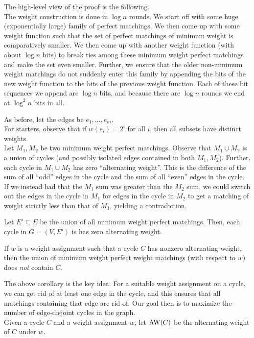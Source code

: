 		The high-level view of the proof is the following.\\
		The weight construction is done in $\log n$ rounds. We start off with some huge (exponentially large) family of perfect matchings. We then come up with some weight function such that the set of perfect matchings of minimum weight is comparatively smaller. We then come up with another weight function (with about $\log n$ bits) to break ties among these minimum weight perfect matchings and make the set even smaller. Further, we ensure that the older non-minimum weight matchings do not suddenly enter this family by appending the bits of the new weight function to the bits of the previous weight function. Each of these bit sequences we append are $\log n$ bits, and because there are $\log n$ rounds we end at $\log^2 n$ bits in all.

		As before, let the edges be $e_1,\ldots,e_m$.\\
		For starters, observe that if $w(e_i) = 2^i$ for all $i$, then all subsets have distinct weights.\\
		Let $M_1,M_2$ be two minimum weight perfect matchings. Observe that $M_1 \cup M_2$ is a union of cycles (and possibly isolated edges contained in both $M_1,M_2$). Further, each cycle in $M_1 \cup M_2$ has zero ``alternating weight''. This is the difference of the sum of all ``odd'' edges in the cycle and the sum of all ``even'' edges in the cycle. If we instead had that the $M_1$ sum was greater than the $M_2$ sum, we could switch out the edges in the cycle in $M_1$ for edges in the cycle in $M_2$ to get a matching of weight strictly less than that of $M_1$, yielding a contradiction.

		\begin{flem}
			\label{lem: union of perfect matchings}
			Let $E' \subseteq E$ be the union of all minimum weight perfect matchings. Then, each cycle in $G = (V,E')$ is has zero alternating weight.
		\end{flem}
		
		\begin{corollary}
			If $w$ is a weight assignment such that a cycle $C$ has nonzero alternating weight, then the union of minimum weight perfect weight matchings (with respect to $w$) does \emph{not} contain $C$.
		\end{corollary}

		The above corollary is the key idea. For a suitable weight assignment on a cycle, we can get rid of at least one edge in the cycle, and this ensures that all matchings containing that edge are rid of. Our goal then is to maximize the number of edge-disjoint cycles in the graph.\\
		Given a cycle $C$ and a weight assignment $w$, let $\operatorname{AW}(C)$ be the alternating weight of $C$ under $w$.

